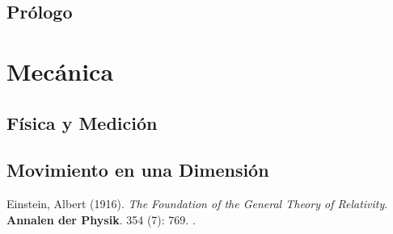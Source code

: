 \documentclass{book}
\begin{document}
\chapter{Pr\'ologo}

%

\part{Mec\'anica}\label{part:mecanica}

\chapter{F\'isica y Medici\'on}\label{ch:fisicamedicion}


%
\chapter{Movimiento en una Dimensi\'on}\label{ch:Movimiento1d}



\begin{thebibliography}{1}

    Einstein, Albert (1916). \emph{The Foundation of the General Theory of Relativity}. \textbf{Annalen der Physik}. 354 (7): 769. .

  \end{thebibliography}
\end{document}
